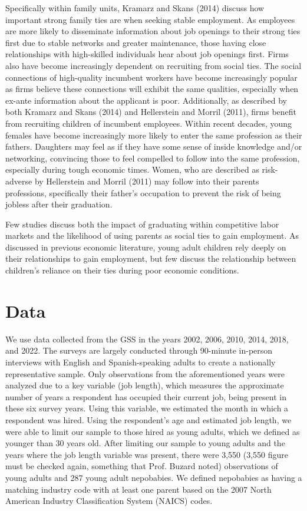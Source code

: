 \documentclass[12pt]{article}
\begin{document}
Specifically within family units, Kramarz and Skans (2014) discuss how important strong family ties are when seeking stable employment. As employees are more likely to disseminate information about job openings to their strong ties first due to stable networks and greater maintenance, those having close relationships with high-skilled individuals hear about job openings first. Firms also have become increasingly dependent on recruiting from social ties. The social connections of high-quality incumbent workers have become increasingly popular as firms believe these connections will exhibit the same qualities, especially when ex-ante information about the applicant is poor. Additionally, as described by both Kramarz and Skans (2014) and Hellerstein and Morril (2011), firms benefit from recruiting children of incumbent employees. Within recent decades, young females have become increasingly more likely to enter the same profession as their fathers. Daughters may feel as if they have some sense of inside knowledge and/or networking, convincing those to feel compelled to follow into the same profession, especially during tough economic times. Women, who are described as risk-adverse by Hellerstein and Morril (2011) may follow into their parents professions, specifically their father’s occupation to prevent the risk of being jobless after their graduation. 

Few studies discuss both the impact of graduating within competitive labor markets and the likelihood of using parents as social ties to gain employment. As discussed in previous economic literature, young adult children rely deeply on their relationships to gain employment, but few discuss the relationship between children’s reliance on their ties during poor economic conditions.


\section{Data}
\label{sec:data}
We use data collected from the GSS in the years 2002, 2006, 2010, 2014, 2018, and 2022. The surveys are largely conducted through 90-minute in-person interviews with English and Spanish-speaking adults to create a nationally representative sample. Only observations from the aforementioned years were analyzed due to a key variable (job length), which measures the approximate number of years a respondent has occupied their current job, being present in these six survey years. Using this variable, we estimated the month in which a respondent was hired. Using the respondent’s age and estimated job length, we were able to limit our sample to those hired as young adults, which we defined as younger than 30 years old. After limiting our sample to young adults and the years where the job length variable was present, there were 3,550 (3,550 figure must be checked again, something that Prof. Buzard noted) observations of young adults and 287 young adult nepobabies. We defined nepobabies as having a matching industry code with at least one parent based on the 2007 North American Industry Classification System (NAICS) codes. 
\end{document}
